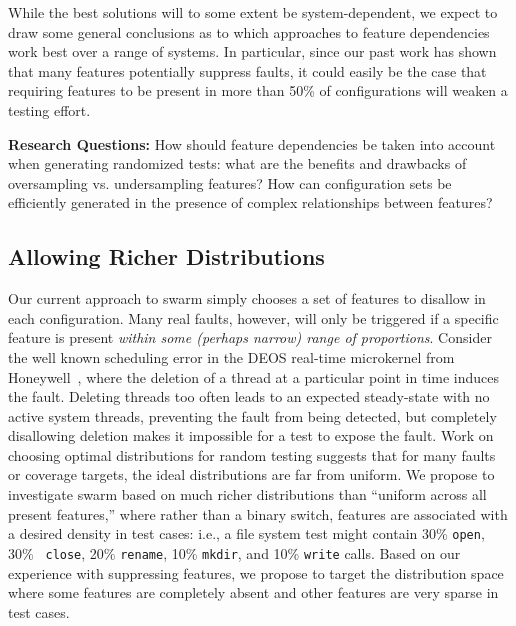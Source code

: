 While the best solutions will to some extent be system-dependent, we
expect to draw some general conclusions as to which approaches to
feature dependencies work best over a range of systems.  
%
In particular, since our past work has shown that many features
potentially suppress faults, it could easily be the case that
requiring features to be present in more than 50\% of configurations
will weaken a testing effort.


\begin{framed}
\textbf{Research Questions:} 
%
How should feature dependencies be taken into account when generating
randomized tests: what are the benefits and drawbacks of oversampling vs. undersampling features?
%
How can configuration sets be efficiently generated in the presence of complex relationships between features?
%
\end{framed}


\subsection{Allowing Richer Distributions}

Our current approach to swarm simply chooses a set of
features to disallow in each configuration.  
%
Many real faults, however, will only be triggered if a specific
feature is present \emph{within some (perhaps narrow) range of
  proportions}.
%
Consider the well known scheduling error in the DEOS real-time
microkernel from Honeywell~\cite{SPIN03}, where the deletion of a
thread at a particular point in time induces the fault.  Deleting
threads too often leads to an expected steady-state with no active
system threads, preventing the fault from being detected, but
completely disallowing deletion makes it impossible for a test to
expose the fault.  Work on choosing optimal distributions for random
testing \cite{AndrewsL07,ASE11Groce} suggests that for many faults or
coverage targets, the ideal distributions are far from uniform.  We
propose to investigate swarm based on much richer distributions than
``uniform across all present features,'' where rather than a binary
switch, features are associated with a desired density in test cases:
i.e., a file system test might contain 30\% {\tt open}, 30\% {\tt
close}, 20\% {\tt rename}, 10\% {\tt mkdir}, and 10\% {\tt write}
calls.  Based on our experience with suppressing features, we
propose to target the distribution space where some features are
completely absent and other features are very sparse in test cases.

